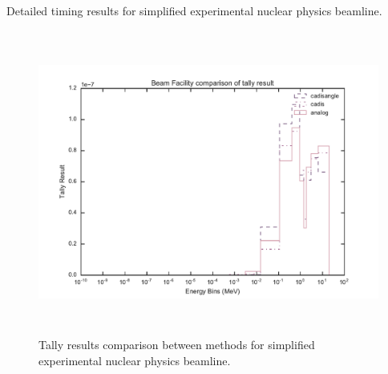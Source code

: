 \begin{table}[h!]
  \centering
  
  \caption[Detailed timing results for simplified experimental nuclear physics
  beamline.]
  {Detailed timing results for simplified experimental nuclear physics beamline.}
  \label{tab:steelbeamtimes}
\end{table}

\begin{figure}[h!]
  \centering
  \includegraphics[height=10cm]{./chapters/characterization_probs/figures/char/beam/beam_facility_tally_result_compare.pdf}
  \caption[Tally results comparison between methods for simplified experimental
    nuclear physics beamline.]
  {Tally results comparison between methods for simplified experimental
    nuclear physics beamline.}
  \label{fig:beamresult}
\end{figure}

